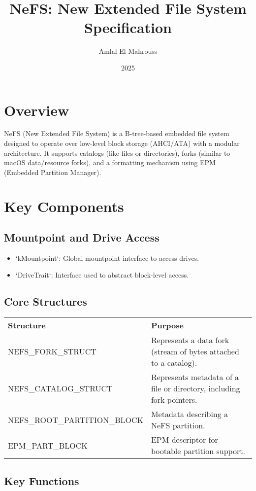 \documentclass{article}
\title{NeFS: New Extended File System Specification}
\author{Amlal El Mahrouss}
\date{2025}
\begin{document}
\maketitle

\section{Overview}
NeFS (New Extended File System) is a B-tree-based embedded file system designed to operate over low-level block storage (AHCI/ATA) with a modular architecture. It supports catalogs (like files or directories), forks (similar to macOS data/resource forks), and a formatting mechanism using EPM (Embedded Partition Manager).

\section{Key Components}

\subsection*{Mountpoint and Drive Access}
\begin{itemize}
  \item `kMountpoint`: Global mountpoint interface to access drives.
  \item `DriveTrait`: Interface used to abstract block-level access.
\end{itemize}

\subsection*{Core Structures}
\begin{longtable}{|l|p{11cm}|}
\hline
\textbf{Structure} & \textbf{Purpose} \\
\hline
NEFS\_FORK\_STRUCT & Represents a data fork (stream of bytes attached to a catalog). \\
\hline
NEFS\_CATALOG\_STRUCT & Represents metadata of a file or directory, including fork pointers. \\
\hline
NEFS\_ROOT\_PARTITION\_BLOCK & Metadata describing a NeFS partition. \\
\hline
EPM\_PART\_BLOCK & EPM descriptor for bootable partition support. \\
\hline
\end{longtable}

\subsection*{Key Functions}
\end{document}
